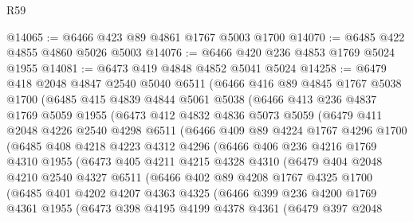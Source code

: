 \begin{lexlean}{R59}
\begin{coremodule}
@14065 := @6466 @423 @89 @4861 @1767 @5003 @1700
@14070 := @6485 @422 @4855 @4860 @5026 @5003
@14076 := @6466 @420 @236 @4853 @1769 @5024 @1955
@14081 := @6473 @419 @4848 @4852 @5041 @5024
@14258 := @6479
    @418
    @2048
    @4847
    @2540
    @5040
    @6511
    (@6466
      @416
      @89
      @4845
      @1767
      @5038
      @1700
      (@6485
        @415
        @4839
        @4844
        @5061
        @5038
        (@6466
          @413
          @236
          @4837
          @1769
          @5059
          @1955
          (@6473
            @412
            @4832
            @4836
            @5073
            @5059
            (@6479
              @411
              @2048
              @4226
              @2540
              @4298
              @6511
              (@6466
                @409
                @89
                @4224
                @1767
                @4296
                @1700
                (@6485
                  @408
                  @4218
                  @4223
                  @4312
                  @4296
                  (@6466
                    @406
                    @236
                    @4216
                    @1769
                    @4310
                    @1955
                    (@6473
                      @405
                      @4211
                      @4215
                      @4328
                      @4310
                      (@6479
                        @404
                        @2048
                        @4210
                        @2540
                        @4327
                        @6511
                        (@6466
                          @402
                          @89
                          @4208
                          @1767
                          @4325
                          @1700
                          (@6485
                            @401
                            @4202
                            @4207
                            @4363
                            @4325
                            (@6466
                              @399
                              @236
                              @4200
                              @1769
                              @4361
                              @1955
                              (@6473
                                @398
                                @4195
                                @4199
                                @4378
                                @4361
                                (@6479
                                  @397
                                  @2048

\end{coremodule}
\end{lexlean}
